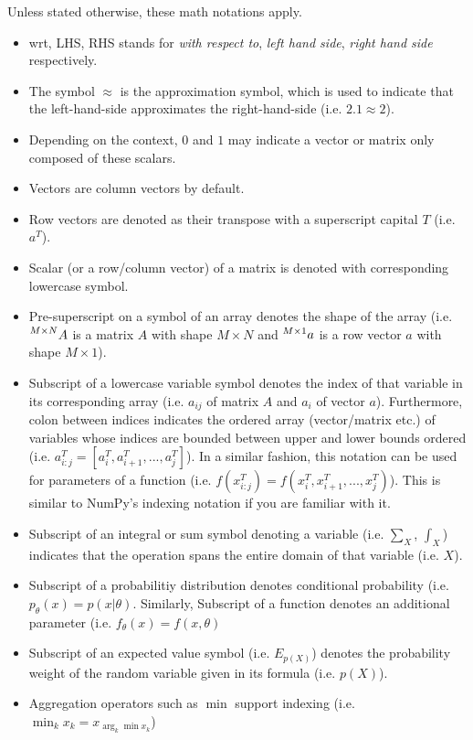 \documentclass{book}
\numberwithin{equation}{subsection}
\begin{document}
Unless stated otherwise, these math notations apply. 
\begin{itemize}
    \item wrt, LHS, RHS stands for \textit{with respect to}, \textit{left hand side}, \textit{right hand side} respectively.
    \item The symbol $\approx$ is the approximation symbol, which is used to indicate that the left-hand-side approximates the right-hand-side (i.e. $2.1 \approx 2$).
    \item Depending on the context, $0$ and $1$ may indicate a vector or matrix only composed of these scalars.
    \item Vectors are column vectors by default.
    \item Row vectors are denoted as their transpose with a superscript capital $T$ (i.e. $a^T$).
    \item Scalar (or a row/column vector) of a matrix is denoted with corresponding lowercase symbol.
    \item Pre-superscript on a symbol of an array denotes the shape of the array (i.e. $\prescript{M\times N}{}{A}$ is a matrix $A$ with shape $M\times N$ and $\prescript{M\times 1}{}{a}$ is a row vector $a$ with shape $M\times 1$).
    \item Subscript of a lowercase variable symbol denotes the index of that variable in its corresponding array (i.e. $a_{ij}$ of matrix $A$ and $a_i$ of vector $a$). Furthermore, colon between indices indicates the ordered array (vector/matrix etc.) of variables whose indices are bounded between upper and lower bounds ordered (i.e. $a^T_{i:j} = [a^T_i, a^T_{i+1}, ..., a^T_j]$). In a similar fashion, this notation can be used for parameters of a function (i.e. $f(x^T_{i:j}) = f(x^T_i, x^T_{i+1}, ..., x^T_j)$). This is similar to NumPy's indexing notation if you are familiar with it.
    \item Subscript of an integral or sum symbol denoting a variable (i.e. $\sum_X$, $\int_X$) indicates that the operation spans the entire domain of that variable (i.e. $X$).
    \item Subscript of a probabilitiy distribution denotes conditional probability (i.e. $p_\theta(x) = p(x|\theta)$. Similarly, Subscript of a function denotes an additional parameter (i.e. $f_\theta(x) = f(x, \theta)$
    \item Subscript of an expected value symbol (i.e. $E_{p(X)}$) denotes the probability weight of the random variable given in its formula (i.e. $p(X)$).
    \item Aggregation operators such as $\min$ support indexing (i.e. $\min_kx_k = x_{\arg_k\min x_k}$)
\end{itemize}
\end{document}
